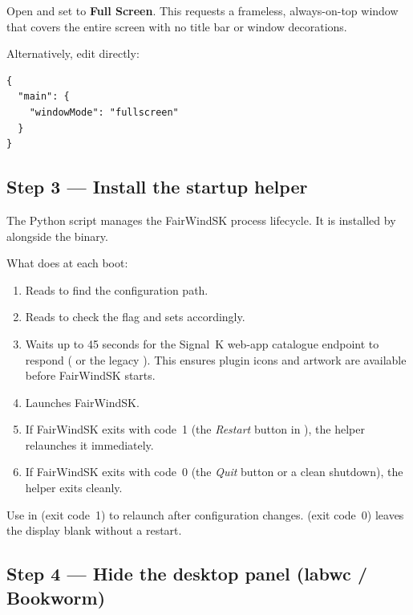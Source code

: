 Open  and set  to
\textbf{Full Screen}.
This requests a frameless, always-on-top window that covers the entire
screen with no title bar or window decorations.

Alternatively, edit  directly:

\begin{lstlisting}
{
  "main": {
    "windowMode": "fullscreen"
  }
}
\end{lstlisting}

\subsection{Step 3 --- Install the startup helper}

The  Python script manages the FairWindSK
process lifecycle.
It is installed by  alongside the binary.

What  does at each boot:

\begin{enumerate}
  \item Reads  to find the configuration path.
  \item Reads  to check the 
        flag and sets  accordingly.
  \item Waits up to 45 seconds for the Signal~K web-app catalogue
        endpoint to respond ( or the legacy
        ).
        This ensures plugin icons and artwork are available before
        FairWindSK starts.
  \item Launches FairWindSK.
  \item If FairWindSK exits with code~1 (the \textit{Restart} button in
        ), the helper relaunches it immediately.
  \item If FairWindSK exits with code~0 (the \textit{Quit} button or
        a clean shutdown), the helper exits cleanly.
\end{enumerate}

\begin{warningbox}
Use  in  (exit code~1)
to relaunch after configuration changes.
 (exit code~0) leaves the display blank
without a restart.
\end{warningbox}

\subsection{Step 4 --- Hide the desktop panel (labwc / Bookworm)}

